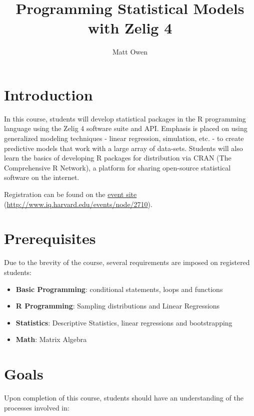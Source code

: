 \documentclass{article}
\title{Programming Statistical Models with Zelig 4}
\author{Matt Owen}
\begin{document}
\maketitle


\section{Introduction}
\label{intro}

In this course, students will develop statistical packages in the R programming
language using the Zelig 4 software suite and API. Emphasis is placed on using
generalized modeling techniques - linear regression, simulation, etc. - to
create predictive models that work with a large array of data-sets. Students will also
learn the basics of developing R packages for distribution via CRAN
(The Comprehensive R Network), a platform for sharing open-source statistical
software on the internet.

Registration can be found on the
\href{http://www.iq.harvard.edu/events/node/2710}{event site}
(\url{http://www.iq.harvard.edu/events/node/2710}).



\section{Prerequisites}
\label{prereq}

Due to the brevity of the course, several requirements are imposed on registered
students:

\begin{itemize}
  \item {\bf Basic Programming}: conditional statements, loops and functions
  \item {\bf R Programming}: Sampling distributions and Linear Regressions
  \item {\bf Statistics}: Descriptive Statistics, linear regressions and
    bootstrapping
  \item {\bf Math}: Matrix Algebra
\end{itemize}



\section{Goals}
\label{goals}

Upon completion of this course, students should have an understanding of the processes
involved in:
\end{document}
